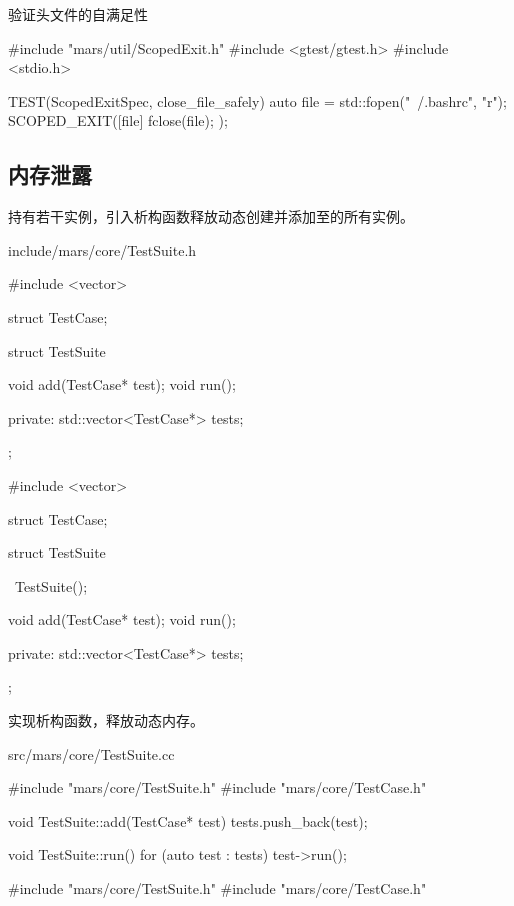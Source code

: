 \begin{content}
\begin{episode}{验证头文件的自满足性}
\begin{content}
\begin{c++}[title={\ttfamily{测试ScopedExit：test/mars/util/ScopedExitSpec.cc}}]
#include "mars/util/ScopedExit.h"
#include <gtest/gtest.h>
#include <stdio.h>

TEST(ScopedExitSpec, close_file_safely) {
  auto file = std::fopen("~/.bashrc", "r");
  SCOPED_EXIT([file] {
    fclose(file);
  });
}
\end{c++}

\end{content}

\end{episode}

\subsection{内存泄露}

持有若干实例，引入析构函数释放动态创建并添加至的所有实例。

\begin{diff}{include/mars/core/TestSuite.h}
 \begin{minicpp}
#include <vector>

struct TestCase;

struct TestSuite {
  void add(TestCase* test);
  void run();

private:
  std::vector<TestCase*> tests;
};
 \end{minicpp}
\tcblower
 \begin{minicpp}
#include <vector>

struct TestCase;

struct TestSuite {
  ~TestSuite();

  void add(TestCase* test);
  void run();

private:
  std::vector<TestCase*> tests;
};
 \end{minicpp}
\end{diff}

实现析构函数，释放动态内存。

\begin{diff}{src/mars/core/TestSuite.cc}
 \begin{minicpp}
#include "mars/core/TestSuite.h"
#include "mars/core/TestCase.h"

void TestSuite::add(TestCase* test) {
  tests.push_back(test);
}

void TestSuite::run() {
  for (auto test : tests) {
    test->run();
  }
}
 \end{minicpp}
\tcblower
 \begin{minicpp}
#include "mars/core/TestSuite.h"
#include "mars/core/TestCase.h"


\end{minicpp}
\end{diff}
\end{content}
